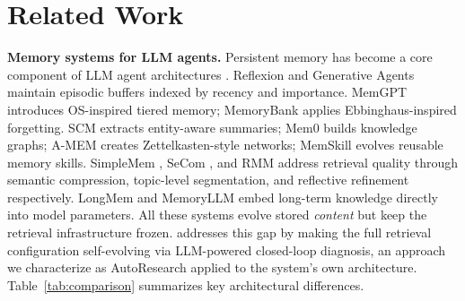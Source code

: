 \section{Related Work}
\label{sec:related}

\noindent \textbf{Memory systems for LLM agents.}
Persistent memory has become a core component of LLM agent architectures \citep{hu2025memory, zhang2024survey, sumers2024coala, wei2025evomemory}. Reflexion \citep{shinn2023reflexion} and Generative Agents \citep{park2023generative} maintain episodic buffers indexed by recency and importance. MemGPT \citep{packer2023memgpt} introduces OS-inspired tiered memory; MemoryBank \citep{zhong2024memorybank} applies Ebbinghaus-inspired forgetting. SCM \citep{wang2024scm} extracts entity-aware summaries; Mem0 \citep{chhikara2025mem0} builds knowledge graphs; A-MEM \citep{xu2025amem} creates Zettelkasten-style networks; MemSkill \citep{zhang2026memskill} evolves reusable memory skills. SimpleMem \citep{liu2026simplemem, omni_simplemem2026}, SeCom \citep{pan2025secom}, and RMM \citep{tan2025rmm} address retrieval quality through semantic compression, topic-level segmentation, and reflective refinement respectively. LongMem \citep{wang2023longmem} and MemoryLLM \citep{wang2024memoryllm} embed long-term knowledge directly into model parameters. All these systems evolve stored \emph{content} but keep the retrieval infrastructure frozen. \ours{} addresses this gap by making the full retrieval configuration self-evolving via LLM-powered closed-loop diagnosis, an approach we characterize as AutoResearch applied to the system's own architecture. Table~\ref{tab:comparison} summarizes key architectural differences.

